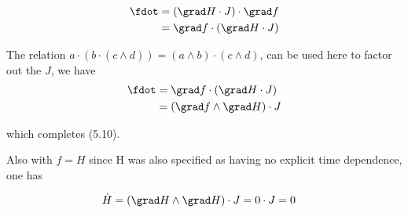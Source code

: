 \begin{align*}
\fdot
&= (\grad H \cdot J) \cdot \grad f \\
&= \grad f \cdot (\grad H \cdot J) \\
\end{align*}

The relation $a \cdot (b \cdot (c \wedge d)) = (a \wedge b) \cdot (c \wedge d)$, 
can be used here to factor out the $J$, we have
\begin{align*}
\fdot
&= \grad f \cdot (\grad H \cdot J) \\
&= (\grad f \wedge \grad H) \cdot J \\
\end{align*}

which completes (5.10).

Also with $f=H$ since H was also specified as having no explicit time dependence, one has

\begin{align*}
\dot{H} &= (\grad H \wedge \grad H) \cdot J = 0 \cdot J = 0
\end{align*}

%
%

%
